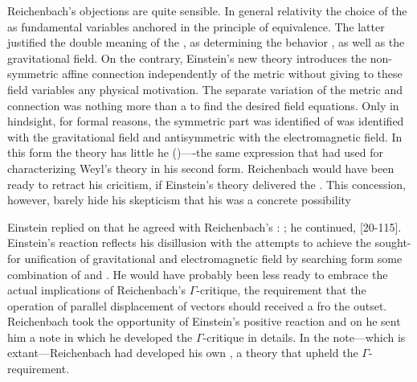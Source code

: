 \documentclass[draft]{article}
\newcommand{\WT}{Weyl's theory\xspace}
\begin{document}
Reichenbach's objections are quite sensible. In general relativity the choice of the \gmn as fundamental variables anchored in the principle of equivalence. The latter justified the double meaning of the \gmn, as determining the behavior \rac, as well as the gravitational field. On the contrary, Einstein's new theory introduces the non-symmetric affine connection \Gtmn independently of the metric \gmn without giving to these field variables any physical motivation. The separate variation of the metric and connection was nothing more than a  to find the desired field equations. Only in hindsight, for formal reasons, the symmetric part was identified of \gmn was identified with the gravitational field and antisymmetric with the electromagnetic field. In this form the theory has little he  ()----the same expression that \citet[367]{Reichenbach1921} had used for characterizing \WT in his second form. Reichenbach would have been ready to retract his cricitism, if Einstein's theory delivered the . This concession, however, barely hide his skepticism that his was a concrete possibility 

Einstein replied on   that he agreed with Reichenbach's : ;  he continued,  [20-115]. Einstein's reaction reflects his disillusion with the attempts to achieve the sought-for unification of gravitational and electromagnetic field by searching form some combination of \Gtmn and \gmn. He would have probably been less ready to embrace the actual implications of Reichenbach's $\Gamma$-critique, the requirement that the operation of parallel displacement of vectors should received a  fro the outset. Reichenbach took the opportunity of Einstein's positive reaction and on  he sent him a note in which he developed the $\Gamma$-critique in details. In the note---which is extant---Reichenbach had developed his own \uft, a theory that upheld the $\Gamma$-requirement.
\end{document}

